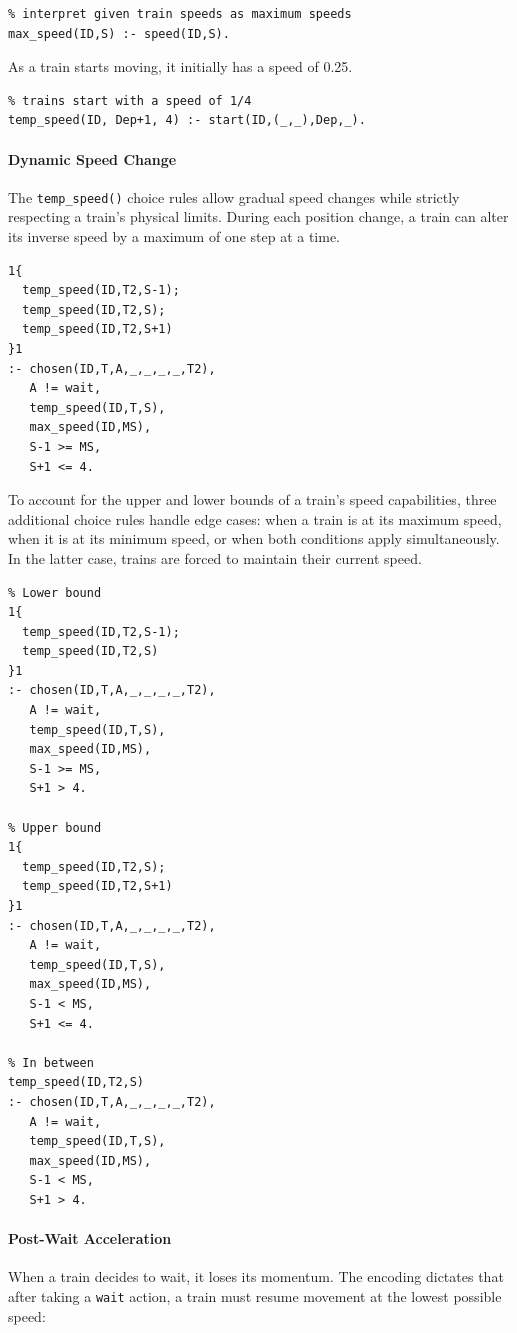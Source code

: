 \begin{verbatim}
% interpret given train speeds as maximum speeds
max_speed(ID,S) :- speed(ID,S).
\end{verbatim}

As a train starts moving, it initially has a speed of 0.25.

\begin{verbatim}
% trains start with a speed of 1/4 
temp_speed(ID, Dep+1, 4) :- start(ID,(_,_),Dep,_).
\end{verbatim}

\paragraph{Dynamic Speed Change}
The \texttt{temp\_speed()} choice rules allow gradual speed changes while strictly respecting a train's physical limits. During each position change, a train can alter its inverse speed by a maximum of one step at a time.

\begin{verbatim}
1{
  temp_speed(ID,T2,S-1);
  temp_speed(ID,T2,S);
  temp_speed(ID,T2,S+1)
}1
:- chosen(ID,T,A,_,_,_,_,T2),
   A != wait,
   temp_speed(ID,T,S),
   max_speed(ID,MS),
   S-1 >= MS,
   S+1 <= 4.
\end{verbatim}

To account for the upper and lower bounds of a train's speed capabilities, three additional choice rules handle edge cases: when a train is at its maximum speed, when it is at its minimum speed, or when both conditions apply simultaneously. In the latter case, trains are forced to maintain their current speed.

\begin{verbatim}
% Lower bound
1{
  temp_speed(ID,T2,S-1);
  temp_speed(ID,T2,S)
}1
:- chosen(ID,T,A,_,_,_,_,T2),
   A != wait,
   temp_speed(ID,T,S),
   max_speed(ID,MS),
   S-1 >= MS,
   S+1 > 4.

% Upper bound
1{
  temp_speed(ID,T2,S);
  temp_speed(ID,T2,S+1)
}1
:- chosen(ID,T,A,_,_,_,_,T2),
   A != wait,
   temp_speed(ID,T,S),
   max_speed(ID,MS),
   S-1 < MS,
   S+1 <= 4.

% In between
temp_speed(ID,T2,S)
:- chosen(ID,T,A,_,_,_,_,T2),
   A != wait,
   temp_speed(ID,T,S),
   max_speed(ID,MS),
   S-1 < MS,
   S+1 > 4.
\end{verbatim}

\paragraph{Post-Wait Acceleration}
When a train decides to wait, it loses its momentum. The encoding dictates that after taking a \texttt{wait} action, a train must resume movement at the lowest possible speed:


